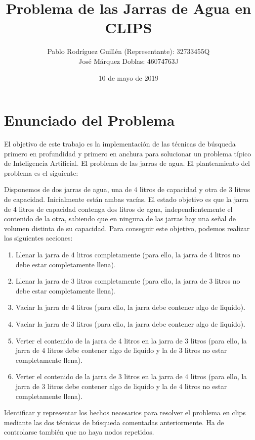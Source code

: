\documentclass[11pt,a4paper,final]{article}
\author{Pablo Rodríguez Guillén (Representante): 32733455Q \\
		José Márquez Doblas: 46074763J}
\title{\textbf{Problema de las Jarras de Agua en CLIPS}}
\date{10 de mayo de 2019}
\begin{document}
\nocite{*}

\maketitle
\tableofcontents
\newpage

\section{Enunciado del Problema}
El objetivo de este trabajo es la implementación de las técnicas de búsqueda primero en profundidad y primero en anchura para solucionar un problema típico de Inteligencia Artificial. El problema de las jarras de agua. El planteamiento del problema es el siguiente:

Disponemos de dos jarras de agua, una de 4 litros de capacidad y otra de 3 litros de capacidad. Inicialmente están ambas vacías. El estado objetivo es que la jarra de 4 litros de capacidad contenga dos litros de agua, independientemente el contenido de la otra, sabiendo que en ninguna de las jarras hay una señal de volumen distinta de su capacidad. Para conseguir este objetivo, podemos realizar las siguientes acciones:

\begin{enumerate}
	\item Llenar la jarra de 4 litros completamente (para ello, la jarra de 4 litros no debe estar completamente llena).
	\item Llenar la jarra de 3 litros completamente (para ello, la jarra de 3 litros no debe estar completamente llena).
	\item Vaciar la jarra de 4 litros (para ello, la jarra debe contener algo de liquido).
	\item Vaciar la jarra de 3 litros (para ello, la jarra debe contener algo de liquido).
	\item Verter el contenido de la jarra de 4 litros en la jarra de 3 litros (para ello, la jarra de 4 litros debe contener algo de liquido y la de 3 litros no estar completamente llena).
	\item Verter el contenido de la jarra de 3 litros en la jarra de 4 litros (para ello, la jarra de 3 litros debe contener algo de liquido y la de 4 litros no estar completamente llena).
\end{enumerate}

Identificar y representar los hechos necesarios para resolver el problema en clips mediante las dos técnicas de búsqueda comentadas anteriormente. Ha de controlarse también que no haya nodos repetidos.
\end{document}
